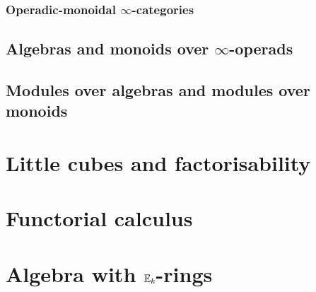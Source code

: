             \subsubsection{Operadic-monoidal \texorpdfstring{$\infty$}{}-categories}
        
        \subsection{Algebras and monoids over \texorpdfstring{$\infty$}{}-operads}
        
        \subsection{Modules over algebras and modules over monoids}
    
    \section{Little cubes and factorisability}
    
    \section{Functorial calculus}
    
    \section{Algebra with \texorpdfstring{$\mathbb{E}_k$}{}-rings}